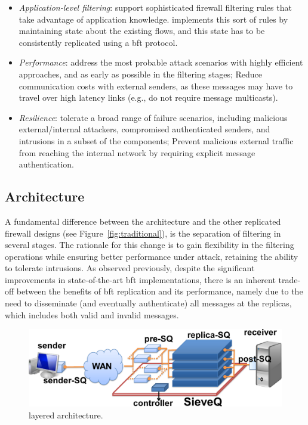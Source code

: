 \begin{itemize}

\item \emph{Application-level filtering}: support sophisticated firewall filtering rules that take advantage of application knowledge. \sieveq implements this sort of rules by maintaining state about the existing flows, and this state has to be consistently replicated using a \gls{bft} protocol.

\item \emph{Performance}: address the most probable attack scenarios with highly efficient approaches, and as early as possible in the filtering stages; Reduce communication costs with external senders, as these messages may have to travel over high latency links (e.g., do not require message multicasts).	

\item \emph{Resilience}: tolerate a broad range of failure scenarios, including malicious external/internal attackers, compromised authenticated senders, and intrusions in a subset of the \sieveq components; Prevent malicious external traffic from reaching the internal network by requiring explicit message authentication.

\end{itemize}

\subsection{\sieveq Architecture}

A fundamental difference between the \sieveq architecture and the other replicated firewall designs (see Figure~\ref{fig:traditional}), is the separation of filtering in several stages.
The rationale for this change is to gain flexibility in the filtering operations while ensuring better performance under attack, retaining the ability to tolerate intrusions.
As observed previously, despite the significant improvements in state-of-the-art \gls{bft} implementations, there is an inherent trade-off between the benefits of \gls{bft} replication and its performance, namely due to the need to disseminate (and eventually authenticate) all messages at the replicas, which includes both valid and invalid messages.

\begin{figure}[t]
\begin{center}
\includegraphics[width=0.9\columnwidth]{images/images/arch.pdf}
\caption{\sieveq layered architecture.}
\label{fig:arch}
\end{center}
\end{figure}


